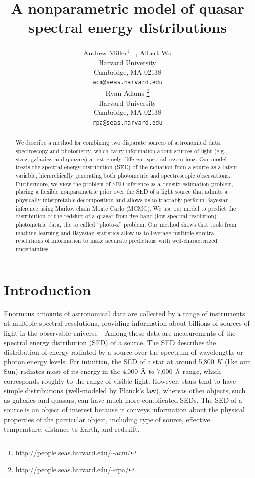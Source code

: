 \documentclass{article} %
\title{A nonparametric model of quasar spectral energy distributions}
\author{
Andrew Miller\thanks{\url{http://people.seas.harvard.edu/\~acm/}} \, ,  Albert Wu \\
Harvard University\\
Cambridge, MA 02138 \\
\texttt{acm@seas.harvard.edu} \\
\And
Ryan Adams \thanks{\url{http://people.seas.harvard.edu/\~rpa/}}\\
Harvard University\\
Cambridge, MA 02138 \\
\texttt{rpa@seas.harvard.edu} \\
}
\begin{document}
\maketitle

\begin{abstract} 
We describe a method for combining two disparate sources of astronomical data, spectroscopy and photometry, which carry information about sources of light (e.g., stars, galaxies, and quasars) at extremely different spectral resolutions. 
Our model treats the spectral energy distribution (SED) of the radiation from a source as a latent variable, hierarchically generating both photometric and spectroscopic observations.  
Furthermore, we view the problem of SED inference as a density estimation problem, placing a flexible nonparametric prior over the SED of a light source that admits a physically interpretable decomposition and allows us to tractably perform Bayesian inference using Markov chain Monte Carlo (MCMC).  
We use our model to predict the distribution of the redshift of a quasar from five-band (low spectral resolution) photometric data, the so called ``photo-z'' problem. 
Our method shows that tools from machine learning and Bayesian statistics allow us to leverage multiple spectral resolutions of information to make accurate predictions with well-characterized uncertainties. 
\end{abstract} 

\section{Introduction}
Enormous amounts of astronomical data are collected by a range of instruments at multiple spectral resolutions, providing information about billions of sources of light in the observable universe~\cite{alam2015eleventh, martin2005galex}.  
Among these data are measurements of the spectral energy distribution (SED) of a source.  
The SED describes the distribution of energy radiated by a source over the spectrum of wavelengths or photon energy levels.  
For intuition, the SED of a star at around 5,800 $K$ (like our Sun) radiates most of its energy in the 4,000 $\textup{\AA}$ to 7,000 $\textup{\AA}$ range, which corresponds roughly to the range of visible light.  
However, stars tend to have simple distributions (well-modeled by Planck's law), whereas other objects, such as galaxies and quasars, can have much more complicated SEDs.  
The SED of a source is an object of interest because it conveys information about the physical properties of the particular object, including type of source, effective temperature, distance to Earth, and redshift. 
\end{document}
